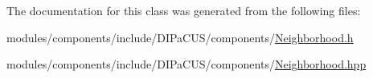 The documentation for this class was generated from the following files\+:\begin{DoxyCompactItemize}
\item 
modules/components/include/\+D\+I\+Pa\+C\+U\+S/components/\mbox{\hyperlink{Neighborhood_8h}{Neighborhood.\+h}}\item 
modules/components/include/\+D\+I\+Pa\+C\+U\+S/components/\mbox{\hyperlink{Neighborhood_8hpp}{Neighborhood.\+hpp}}\end{DoxyCompactItemize}
